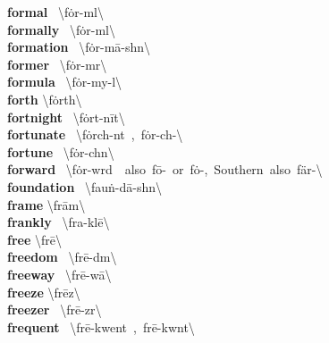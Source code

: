 \documentclass[10pt,a4paper]{article}
\begin{document}
\begin{multicols}{2}
\textbf{ formal }\quad \ \textbackslash \textprimstress f\.{o}r-m\textschwa l\textbackslash \\
\textbf{ formally }\quad \ \textbackslash \textprimstress f\.{o}r-m\textschwa l\textbackslash \\
\textbf{ formation }\quad \ \textbackslash f\.{o}r-\textprimstress m\={a}-sh\textschwa n\textbackslash \\
\textbf{ former }\quad \ \textbackslash \textprimstress f\.{o}r-m\textschwa r\textbackslash \\
\textbf{ formula }\quad \ \textbackslash \textprimstress f\.{o}r-my\textschwa -l\textschwa \textbackslash \\
\textbf{ forth }\quad \textbackslash \textprimstress f\.{o}rth\textbackslash \\
\textbf{ fortnight }\quad \ \textbackslash \textprimstress f\.{o}rt-\textsecstress n\={i}t\textbackslash \\
\textbf{ fortunate }\quad \ \textbackslash \textprimstress f\.{o}rch-n\textschwa t\ ,\ \textprimstress f\.{o}r-ch\textschwa -\textbackslash \\
\textbf{ fortune }\quad \ \textbackslash \textprimstress f\.{o}r-ch\textschwa n\textbackslash \\
\textbf{ forward }\quad \ \textbackslash \textprimstress f\.{o}r-w\textschwa rd\ \ also\ \textprimstress f\={o}-\ or\ \textprimstress f\.{o}-,\ Southern\ also\ \textprimstress f\"{a}r-\textbackslash \\
\textbf{ foundation }\quad \ \textbackslash fau\. n-\textprimstress d\={a}-sh\textschwa n\textbackslash \\
\textbf{ frame }\quad \textbackslash \textprimstress fr\={a}m\textbackslash \\
\textbf{ frankly }\quad \ \textbackslash \textprimstress fra\engma -kl\={e}\textbackslash \\
\textbf{ free }\quad \textbackslash \textprimstress fr\={e}\textbackslash \\
\textbf{ freedom }\quad \ \textbackslash \textprimstress fr\={e}-d\textschwa m\textbackslash \\
\textbf{ freeway }\quad \ \textbackslash \textprimstress fr\={e}-\textsecstress w\={a}\textbackslash \\
\textbf{ freeze }\quad \textbackslash \textprimstress fr\={e}z\textbackslash \\
\textbf{ freezer }\quad \ \textbackslash \textprimstress fr\={e}-z\textschwa r\textbackslash \\
\textbf{ frequent }\quad \ \textbackslash fr\={e}-\textprimstress kwent\ ,\ \textprimstress fr\={e}-kw\textschwa nt\textbackslash \\

\end{multicols}
\end{document}

